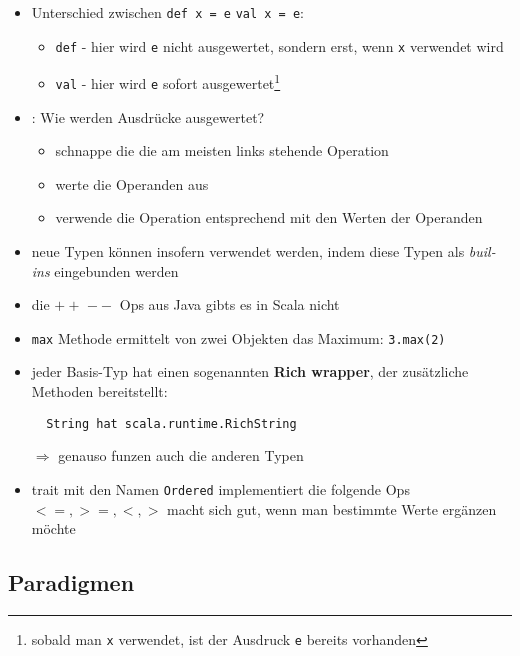 \begin{itemize}
  \item Unterschied zwischen \texttt{def x = e} \und \texttt{val x = e}:
  \begin{itemize}
    \item \texttt{def} - hier wird \texttt{e} nicht ausgewertet, sondern erst,
    wenn \texttt{x} verwendet wird
    \item \texttt{val} - hier wird \texttt{e} sofort 
    ausgewertet\footnote{sobald man \texttt{x} verwendet, ist der Ausdruck 
    \texttt{e} bereits vorhanden}
  \end{itemize}
  \item {}: Wie werden Ausdrücke ausgewertet? \begin{itemize}
    \item schnappe die die am meisten links stehende Operation
    \item werte die Operanden aus
    \item verwende die Operation entsprechend mit den Werten der Operanden
  \end{itemize}
  \item neue Typen können insofern verwendet werden,
  indem diese Typen als \textit{buil-ins} eingebunden
  werden
  \item die $++$ \und $--$ Ops aus Java gibts es in Scala nicht
  \item \texttt{max} Methode ermittelt von zwei Objekten das
  Maximum: \texttt{3.max(2)}
  \item jeder Basis-Typ hat einen sogenannten \textbf{Rich wrapper}, der
  zusätzliche Methoden bereitstellt:
  
  \begin{verbatim}
  String hat scala.runtime.RichString
  \end{verbatim}
  
  $\Rightarrow$ genauso funzen auch die anderen Typen
  
  \item trait mit den Namen \texttt{Ordered} implementiert die folgende
  Ops $<=, >=, <, >$ \und macht sich gut, wenn man bestimmte Werte
  ergänzen möchte
  
  
  
\end{itemize}


\subsection{Paradigmen}


